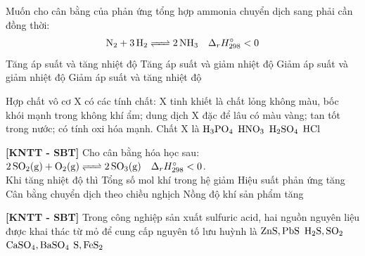 \documentclass[12pt,a4paper]{article}
\begin{document}
\begin{ex}
Muốn cho cân bằng của phản ứng tổng hợp ammonia chuyển dịch sang phải cần đồng thời:
\[\ce{N2 + 3H2 <=> 2NH3} \quad \Delta_r H^\circ_{298} < 0\]
\choice
{Tăng áp suất và tăng nhiệt độ}
{\True Tăng áp suất và giảm nhiệt độ}
{Giảm áp suất và giảm nhiệt độ}
{Giảm áp suất và tăng nhiệt độ}

\end{ex}

\begin{ex}
Hợp chất vô cơ X có các tính chất: X tinh khiết là chất lỏng không màu, bốc khói mạnh trong không khí ẩm; dung dịch X đặc để lâu có màu vàng; tan tốt trong nước; có tính oxi hóa mạnh. Chất X là
\choice
{$\ce{H3PO4}$}
{\True $\ce{HNO3}$}
{$\ce{H2SO4}$}
{$\ce{HCl}$}

\end{ex}

\begin{ex}
\textbf{[KNTT - SBT]} Cho cân bằng hóa học sau: $\ce{2SO2(g) + O2(g) <=> 2SO3(g)} \quad \Delta_r H^\circ_{298} < 0$.\\
Khi tăng nhiệt độ thì
\choice
{Tổng số mol khí trong hệ giảm}
{Hiệu suất phản ứng tăng}
{\True Cân bằng chuyển dịch theo chiều nghịch}
{Nồng độ khí sản phẩm tăng}

\end{ex}

\begin{ex}
\textbf{[KNTT - SBT]} Trong công nghiệp sản xuất sulfuric acid, hai nguồn nguyên liệu được khai thác từ mỏ để cung cấp nguyên tố lưu huỳnh là
\choice
{$\ce{ZnS, PbS}$}
{$\ce{H2S, SO2}$}
{$\ce{CaSO4, BaSO4}$}
{\True $\ce{S, FeS2}$}

\end{ex}
\end{document}
